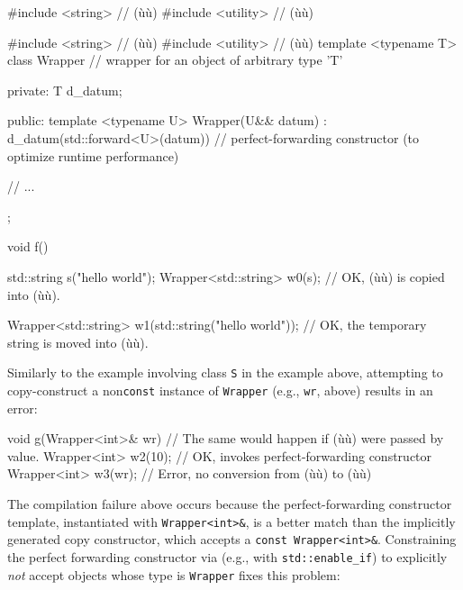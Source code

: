 \begin{emcppshiddenlisting}[emcppsbatch=e18]
#include <string>   // (ù{}ù)
#include <utility>  // (ù{}ù)
\end{emcppshiddenlisting}
\begin{emcppslisting}[emcppsbatch=e18]
#include <string>   // (ù{}ù)
#include <utility>  // (ù{}ù)
template <typename T>
class Wrapper  // wrapper for an object of arbitrary type 'T'
{
private:
    T d_datum;

public:
    template <typename U>
    Wrapper(U&& datum) : d_datum(std::forward<U>(datum)) { }
        // perfect-forwarding constructor (to optimize runtime performance)

    // ...
};

void f()
{
    std::string s("hello world");
    Wrapper<std::string> w0(s);  // OK, (ù{}ù) is copied into (ù{}ù).

    Wrapper<std::string> w1(std::string("hello world"));
        // OK, the temporary string is moved into (ù{}ù).
}
\end{emcppslisting}

\noindent Similarly to the example involving class \lstinline!S! in the example above, attempting
to copy-construct a non\lstinline!const! instance of \lstinline!Wrapper!
(e.g., \lstinline!wr!, above) results in an error:

\begin{emcppslisting}[emcppsbatch=e18]
void g(Wrapper<int>& wr)  // The same would happen if (ù{}ù) were passed by value.
{
    Wrapper<int> w2(10);  // OK, invokes perfect-forwarding constructor
    Wrapper<int> w3(wr);  // Error, no conversion from (ù{}ù) to (ù{}ù)
}
\end{emcppslisting}

\noindent The compilation failure above occurs because the perfect-forwarding
constructor template, instantiated with \lstinline!Wrapper<int>&!, is a
better match than the implicitly generated copy constructor, which
accepts a \lstinline!const!~\lstinline!Wrapper<int>&!. Constraining the
perfect forwarding constructor via  (e.g., with
\lstinline!std::enable_if!) to explicitly \emph{not} accept objects whose
type is \lstinline!Wrapper! fixes this problem:

